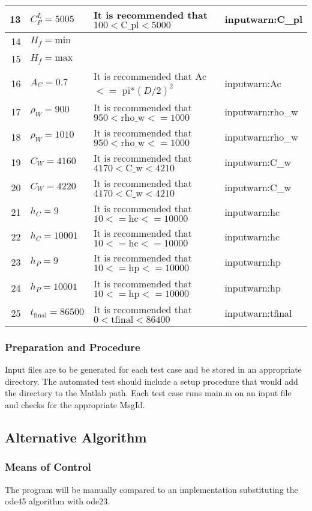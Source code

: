 \documentclass[12pt]{article}
\begin{document}
\begin{center}
\begin{longtable}{ | r | p{3cm} | p{5cm} | p{4cm} |}
	13 & $C^L_P = 5005$ & It is recommended that $100 < \text{C\_{pl}} < 5000$ & inputwarn:C\_{pl} \\ \hline
	14 & $H_f = \text{min}$ & & \\ \hline
	15 & $H_f = \text{max}$ & & \\ \hline
	16 & $A_C = 0.7$ & It is recommended that Ac $<=$ pi*$(D/2)^2$ & inputwarn:Ac\\ \hline
	17 & $\rho_W = 900$ & It is recommended that $950 < \text{rho\_{w}} <= 1000$ & inputwarn:rho\_{w} \\ \hline
	18 & $\rho_W = 1010$ & It is recommended that $950 < \text{rho\_{w}} <= 1000$ & inputwarn:rho\_{w} \\ \hline
	19 & $C_W = 4160$ & It is recommended that $4170 < \text{C\_{w}} < 4210$ & inputwarn:C\_{w} \\ \hline
	20 & $C_W = 4220$ & It is recommended that $4170 < \text{C\_{w}} < 4210$ & inputwarn:C\_{w} \\ \hline
	21 & $h_C = 9$ & It is recommended that $10 <= \text{hc} <= 10000$ & inputwarn:hc \\ \hline
	22 & $h_C = 10001$ & It is recommended that $10 <= \text{hc} <= 10000$ & inputwarn:hc \\ \hline
	23 & $h_P = 9$ & It is recommended that $10 <= \text{hp} <= 10000$ & inputwarn:hp \\ \hline
	24 & $h_P = 10001$ & It is recommended that $10 <= \text{hp} <= 10000$ & inputwarn:hp \\ \hline
	25 & $t_{\text{final}} = 86500$ & It is recommended that $0 < \text{tfinal} < 86400$ & inputwarn:tfinal \\ \hline
	\end{longtable}
\end{center}

\subsubsection{Preparation and Procedure}
Input files are to be generated for each test case and be stored in an appropriate
 directory. The automated test should include a setup procedure that would add 
 the directory to the Matlab path. Each test case runs main.m on an input file
  and checks for the appropriate MsgId. 

\subsection{Alternative Algorithm}
\subsubsection{Means of Control}
The program will be manually compared to an implementation substituting the ode45
 algorithm with ode23. 
\end{document}
